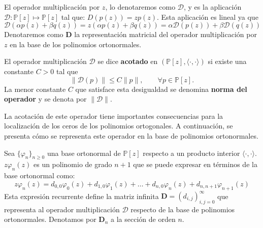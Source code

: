 \begin{definition}\label{def:d_application}
	El operador multiplicación por $z$, lo denotaremos como $\mathcal{D}$, y es la aplicación $\mathcal{D}:\mathbb{P}[z] \mapsto \mathbb{P}[z]$ tal que: $D(p(z))=zp(z)$.
	Esta aplicación es lineal ya que
	$$\mathcal{D}(\alpha p(z) + \beta q(z))=z(\alpha p(z) + \beta q(z))=\alpha \mathcal{D}(p(z)) + \beta \mathcal{D}(q(z))$$
	\noindent Denotaremos como $\mathbf{D}$ la representación matricial del operador multiplicación por $z$ en la base de los polinomios ortonormales.
\end{definition}

\begin{definition}\label{def:bounded_operator}
	El operador multiplicación $\mathcal{D}$ se dice \textbf{acotado} en $(\mathbb{P}[z], \langle \cdot, \cdot \rangle)$ si existe una constante $C > 0$ tal que
	\[
		\|\mathcal{D}(p)\| \leq C \|p\|, \qquad \forall p \in \mathbb{P}[z].
	\]
	La menor constante $C$ que satisface esta desigualdad se denomina \textbf{norma del operador} y se denota por $\|\mathcal{D}\|$.
\end{definition}

La acotación de este operador tiene importantes consecuencias para la localización de los ceros de los polinomios ortogonales. A continuación, se presenta cómo se representa este operador en la base de polinomios ortonormales.

\begin{definition}\label{def:d_representation}
	Sea \(\{\varphi_n\}_{n\ge0}\) una base ortonormal de \(\mathbb{P}[z]\) respecto a un
	producto interior \(\langle\!\cdot,\cdot\!\rangle\).
	$z\varphi_n(z)$ es un polinomio de grado $n+1$ que se puede expresar en términos de la base ortonormal como:
	$$
		z\varphi_n(z)= d_{0,0}\varphi_0(z)+d_{1,0}\varphi_1(z)+\dots+d_{n,0}\varphi_n(z)+d_{n,n+1}\varphi_{n+1}(z)
	$$
	\noindent Esta expresión recurrente define la matriz infinita $\mathbf{D}=(d_{i,j})_{i,j=0}^{\infty}$ que representa al operador multiplicación $\mathcal{D}$ respecto de la base de polinomios ortonormales. Denotamos por $\mathbf{D}_n$ a la sección de orden $n$.
\end{definition}

